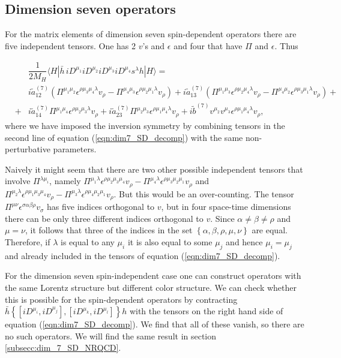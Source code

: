 \subsection{Dimension seven operators}
For the matrix elements of dimension seven spin-dependent operators there are  five independent tensors. One has 2 $v$'s and $\epsilon$ and four that have $\Pi$ and $\epsilon$. Thus 

\begin{eqnarray}\label{eqn:dim7_SD_decomp}
&&\dfrac1{2M_H}\langle H |\bar h\, iD^{\mu_1}iD^{\mu_2}iD^{\mu_3}iD^{\mu_4}s^\lambda h|H\rangle=\nonumber\\
&&i\tilde a_{12}^{(7)}\left(\Pi^{\mu_1\mu_2}\epsilon^{\rho\mu_3\mu_4\lambda}v_{\rho}-\Pi^{\mu_4\mu_3}\epsilon^{\rho\mu_2\mu_1\lambda}v_{\rho}\right)+i\tilde a_{13}^{(7)}\left(\Pi^{\mu_1\mu_3}\epsilon^{\rho\mu_2\mu_4\lambda}v_{\rho}-\Pi^{\mu_4\mu_2}\epsilon^{\rho\mu_3\mu_1\lambda}v_{\rho}\right)+\nonumber\\
&+&i\tilde a_{14}^{(7)}\Pi^{\mu_1\mu_4}\epsilon^{\rho\mu_2\mu_3\lambda}v_{\rho}+i\tilde a_{23}^{(7)}\Pi^{\mu_2\mu_3}\epsilon^{\rho\mu_1\mu_4\lambda}v_{\rho}+i\tilde b^{(7)}v^{\mu_2}v^{\mu_3}\epsilon^{\rho\mu_1\mu_4\lambda}v_{\rho},
\end{eqnarray}
where we have imposed the inversion symmetry by combining  tensors in the second line of equation (\ref{eqn:dim7_SD_decomp}) with the same non-perturbative parameters.

Naively it might seem that there are two other possible independent tensors that involve $\Pi^{\lambda\mu_i}$, namely $\Pi^{\mu_1\lambda}\epsilon^{\rho\mu_2\mu_3\mu_4}v_{\rho}-\Pi^{\mu_4\lambda}\epsilon^{\rho\mu_3\mu_2\mu_1}v_{\rho}$ and $\Pi^{\mu_2\lambda}\epsilon^{\rho\mu_1\mu_3\mu_4}v_{\rho}-\Pi^{\mu_3\lambda}\epsilon^{\rho\mu_4\mu_2\mu_1}v_{\rho}$. But this would be an over-counting. The tensor $\Pi^{\mu\nu}\epsilon^{\sigma\alpha\beta\rho}v_\sigma$ has five indices orthogonal to $v$, but in four space-time dimensions there can be only three different indices orthogonal to $v$. Since $\alpha\neq\beta\neq\rho$ and $\mu=\nu$, it follows that three of the indices in the set  $\left\{\alpha, \beta,\rho,\mu,\nu\right\}$ are equal. Therefore, if $\lambda$ is equal to any $\mu_i$ it is also equal to some $\mu_j$ and hence $\mu_i=\mu_j$ and already included in the tensors of equation (\ref{eqn:dim7_SD_decomp}). 

For the dimension seven spin-independent case one can construct operators with the same Lorentz structure but different color structure. We can check whether this is possible for the spin-dependent operators by contracting $\bar h\left\{[iD^{\mu_i},iD^{\mu_j}],[iD^{\mu_k},iD^{\mu_l}]\right\}h$ with the tensors on the right hand side of equation (\ref{eqn:dim7_SD_decomp}). We find that all of these vanish, so there are no such operators. We will find the same result in section \ref{subsecc:dim_7_SD_NRQCD}. 
